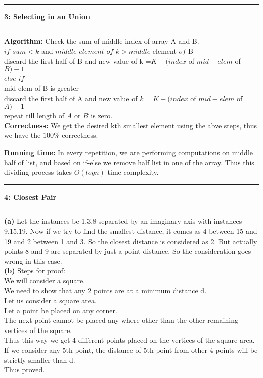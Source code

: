 \documentclass[11pt]{article}
\newcommand\question[2]{\vspace{.25in}\hrule\textbf{#1: #2}\vspace{.5em}\hrule\vspace{.10in}}
\renewcommand\part[1]{\vspace{.10in}\textbf{(#1)}}
\newcommand\algorithm{\vspace{.10in}\textbf{Algorithm: }}
\newcommand\correctness{\vspace{.10in}\textbf{Correctness: }}
\newcommand\runtime{\vspace{.10in}\textbf{Running time: }}
\begin{document}
\question{3}{Selecting in an Union}
\algorithm Check the sum of middle index of array A and B.
\\$if$ $sum<k$ and $middle$ $element$ $of$ $k>middle$ element $of$ B
\\discard the first half of B and new value of k =$K - (index$ of $mid-elem$ of $B)-1$
\\$else$ $if$
\\mid-elem of B is greater
\\discard the first half of A and new value of $k =K - (index$ of $mid-elem$ of $A)-1$
\\repeat till length of $A$ or $B$ is zero.\\
\correctness We get the desired kth smallest element using the abve steps, thus we have the $100\% $ correctness.

\runtime In every repetition, we are performing computations on middle half of list, and based on if-else we remove half list in one of the array. Thus this dividing process takes $O(log n)$ time complexity.

\question{4}{Closest Pair}

\part{a}
Let the instances be 1,3,8 separated by an imaginary axis with instances 9,15,19. Now if we try to find the smallest distance, it comes as 4 between 15 and 19 and 2 between 1 and 3. So the closest distance is considered as 2. But actually points 8 and 9 are separated by just a point distance. So the consideration goes wrong in this case.
\\
\part{b} 
Steps for proof:
\\We will consider a square.
\\We need to show that any 2 points are at a minimum distance d.
\\Let us consider a square area.
\\Let a point be placed on any corner.
\\The next point cannot be placed any where other than the other remaining vertices of the square.
\\Thus this way we get 4 different points placed on the vertices of the square area.
\\If we consider any 5th point, the distance of 5th point from other 4 points will be strictly smaller than d.
\\Thus proved.
\end{document}
